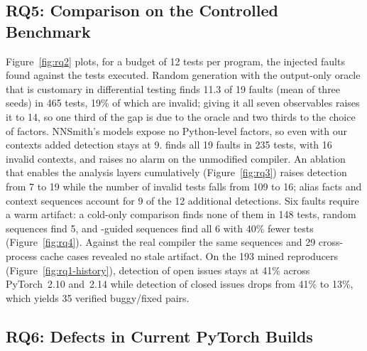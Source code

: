 
\subsection{RQ5: Comparison on the Controlled Benchmark}
\label{sec:rq5}



Figure~\ref{fig:rq2} plots, for a budget of 12 tests per program, the injected faults found against the tests
executed. Random generation with the output-only oracle that is customary in differential testing finds 11.3 of
19 faults (mean of three seeds) in 465 tests, 19\% of which are invalid; giving it all seven observables raises
it to 14, so one third of the gap is due to the oracle and two thirds to the choice of factors. NNSmith's
models expose no Python-level factors, so even with our contexts added detection stays at 9. \tool finds all 19 faults in 235 tests, with 16 invalid
contexts, and raises no alarm on the unmodified compiler. An ablation that enables the analysis layers
cumulatively (Figure~\ref{fig:rq3}) raises detection from 7 to 19 while the number of invalid tests falls from
109 to 16; alias facts and context sequences account for 9 of the 12 additional detections. Six faults require
a warm artifact: a cold-only comparison finds none of them in 148 tests, random sequences find 5, and
\scs-guided sequences find all 6 with 40\% fewer tests (Figure~\ref{fig:rq4}). Against the real compiler the
same sequences and 29 cross-process cache cases revealed no stale artifact. On the 193 mined reproducers
(Figure~\ref{fig:rq1-history}), detection of open issues stays at 41\% across PyTorch~2.10 and~2.14 while
detection of closed issues drops from 41\% to 13\%, which yields 35 verified buggy/fixed pairs.






\subsection{RQ6: Defects in Current PyTorch Builds}
\label{sec:rq6}

